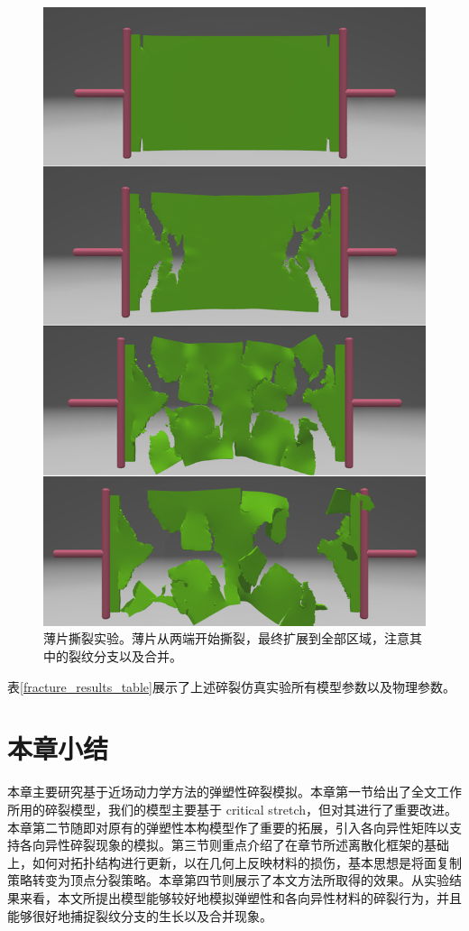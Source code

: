 \begin{figure}[!htb]
  \centering
  \captionsetup{justification=centering}
  \includegraphics[width=0.6\linewidth]{chap/image/demo_tear_thin_sheet}

  \caption{\label{demo_tear_thin_sheet}
           薄片撕裂实验。薄片从两端开始撕裂，最终扩展到全部区域，注意其中的裂纹分支以及合并。
          }
\end{figure}

表\ref{fracture_results_table}展示了上述碎裂仿真实验所有模型参数以及物理参数。


\section{本章小结}

本章主要研究基于近场动力学方法的弹塑性碎裂模拟。本章第一节给出了全文工作所用的碎裂模型，我们的模型主要基于 critical stretch，但对其进行了重要改进。本章第二节随即对原有的弹塑性本构模型作了重要的拓展，引入各向异性矩阵以支持各向异性碎裂现象的模拟。第三节则重点介绍了在章节\label{discretization}所述离散化框架的基础上，如何对拓扑结构进行更新，以在几何上反映材料的损伤，基本思想是将面复制策略转变为顶点分裂策略。本章第四节则展示了本文方法所取得的效果。从实验结果来看，本文所提出模型能够较好地模拟弹塑性和各向异性材料的碎裂行为，并且能够很好地捕捉裂纹分支的生长以及合并现象。

